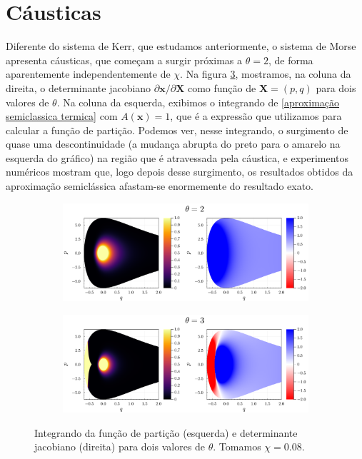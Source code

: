 \documentclass[
	12pt,
	oneside,			%
	a4paper,			%
	english,			%
	brazil				%
	]{abntex2}
\theoremstyle{definition}
\begin{document}
\section{Cáusticas}

Diferente do sistema de Kerr, que estudamos anteriormente, o sistema de Morse apresenta cáusticas, que começam a surgir próximas a $\theta = 2$, de forma aparentemente independentemente de $\chi$. Na figura \ref{det part}, mostramos, na coluna da direita, o determinante jacobiano $\partial \mathbf{x}/ \partial \mathbf{X}$ como função de $\mathbf{X} = (p,q)$ para dois valores de $\theta$. Na coluna da esquerda, exibimos o integrando de \eqref{aproximação semiclassica termica} com $A(\mathbf{x})=1$, que é a expressão que utilizamos para calcular a função de partição. Podemos ver, nesse integrando, o surgimento de quase uma descontinuidade (a mudança abrupta do preto para o amarelo na esquerda do gráfico) na região que é atravessada pela cáustica, e experimentos numéricos mostram que, logo depois desse surgimento, os resultados obtidos da aproximação semiclássica afastam-se enormemente do resultado exato. 

\begin{figure}[H]
     \centering
     \begin{subfigure}[b]{\textwidth}
         \includegraphics[width=\textwidth]{Imagens/det_part_1.png}
        \centering
    \label{det part 1}
     \end{subfigure}
     \vfill
     \begin{subfigure}[b]{\textwidth}
         \includegraphics[width=\textwidth]{Imagens/det_part_2.png}
        \centering
    \label{det part 2}
     \end{subfigure}
        \caption{Integrando da função de partição (esquerda) e determinante jacobiano (direita) para dois valores de $\theta$. Tomamos $\chi=0.08$.}
        \label{det part}
\end{figure}
\end{document}
